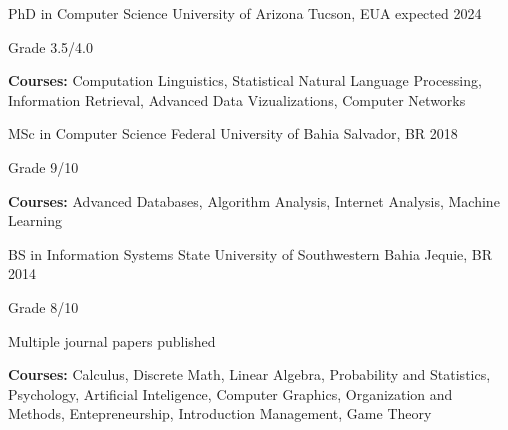 

\begin{cventries}


  \cventry
    {PhD in Computer Science} %
    {University of Arizona} %
    {Tucson, EUA} %
    {expected 2024} %
    {
      \begin{cvitems} %
        \item {Grade 3.5/4.0}
        \item {\textbf{Courses:} } Computation Linguistics, Statistical Natural Language Processing, Information Retrieval, Advanced Data Vizualizations, Computer Networks
      \end{cvitems}
    }

  \cventry
    {MSc in Computer Science} %
    {Federal University of Bahia} %
    {Salvador, BR} %
    {2018} %
    {
      \begin{cvitems} %
        \item {Grade 9/10}
        \item {\textbf{Courses:} } Advanced Databases, Algorithm Analysis, Internet Analysis, Machine Learning
      \end{cvitems}
    }
    
  \cventry
    {BS in Information Systems} %
    {State University of Southwestern Bahia} %
    {Jequie, BR} %
    {2014} %
    {
      \begin{cvitems} %
        \item {Grade 8/10}
        \item {Multiple journal papers published}
        \item {\textbf{Courses:} } Calculus, Discrete Math, Linear Algebra, Probability and Statistics, Psychology, Artificial Inteligence, Computer Graphics, Organization and Methods, Entepreneurship, Introduction Management, Game Theory
      \end{cvitems}
    }
    
\end{cventries}
